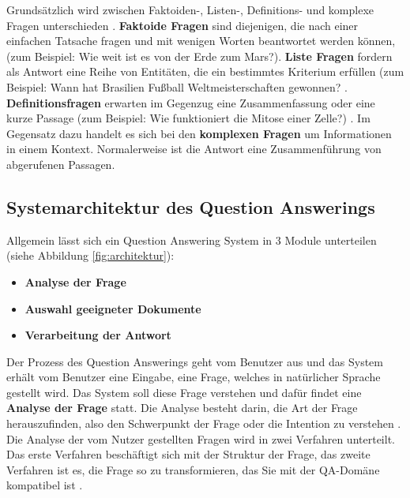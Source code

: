 \documentclass[
        ngerman,
        paper=a4,
        numbers=noendperiod,
]{scrreprt}
\begin{document}
Grundsätzlich wird zwischen Faktoiden-, Listen-, Definitions- und komplexe Fragen unterschieden \citep{Kolomiyets2011APerspective}. \textbf{Faktoide Fragen} sind diejenigen, die nach einer einfachen Tatsache fragen und mit wenigen Worten beantwortet werden können, (zum Beispiel: Wie weit ist es von der Erde zum Mars?). \textbf{Liste Fragen} fordern als Antwort eine Reihe von Entitäten, die ein bestimmtes Kriterium erfüllen (zum Beispiel: Wann hat Brasilien Fußball Weltmeisterschaften gewonnen? \citep{Heie2012QuestionModelling}. \textbf{Definitionsfragen} erwarten im Gegenzug eine Zusammenfassung oder eine kurze Passage (zum Beispiel: Wie funktioniert die Mitose einer Zelle?) \citep{Neves2015QuestionBiology}. Im Gegensatz dazu handelt es sich bei den \textbf{komplexen Fragen} um Informationen in einem Kontext. Normalerweise ist die Antwort eine Zusammenführung von abgerufenen Passagen.


\subsection{Systemarchitektur des Question Answerings} %

%

Allgemein lässt sich ein Question Answering System in 3 Module unterteilen (siehe Abbildung \ref{fig:architektur}):
\begin{itemize}
    \item \textbf{Analyse der Frage}
    \item \textbf{Auswahl geeigneter Dokumente}
    \item \textbf{Verarbeitung der Antwort} 
\end{itemize}

Der Prozess des Question Answerings geht vom Benutzer aus und das System erhält vom Benutzer eine Eingabe, eine Frage, welches in natürlicher Sprache gestellt wird. Das System soll diese Frage verstehen und dafür findet eine \textbf{Analyse der Frage} statt. Die Analyse besteht darin, die Art der Frage herauszufinden, also den Schwerpunkt der Frage oder die Intention zu verstehen \citep{Malik2013DomainSystem}. Die Analyse der vom Nutzer gestellten Fragen wird in zwei Verfahren unterteilt. Das erste Verfahren beschäftigt sich mit der Struktur der Frage, das zweite Verfahren ist es, die Frage so zu transformieren, das Sie mit der QA-Domäne kompatibel ist \citep{Hamed2016AClassification}.
\end{document}
